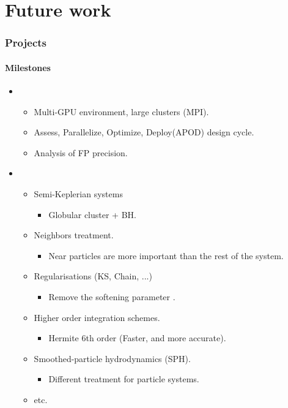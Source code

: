 \section{Future work}
\begin{frame}
    \frametitle{Projects}
    \framesubtitle{Milestones}

    \begin{itemize}
        \item {}
        \begin{itemize}
            \item<2-> Multi-GPU environment, large clusters (MPI).
            \item<3-> Assess, Parallelize, Optimize, Deploy(APOD) design cycle.
            \item<4-> Analysis of FP precision.
        \end{itemize}
        \item {}
        \begin{itemize}
            \item<5-> Semi-Keplerian systems
            \begin{itemize}
                \item Globular cluster + BH.
            \end{itemize}
            \item<6-> Neighbors treatment.
            \begin{itemize}
                \item Near particles are more important than the rest of the system.
            \end{itemize}
            \item<7-> Regularisations (KS, Chain, ...)
            \begin{itemize}
                \item Remove the softening parameter .
            \end{itemize}
            \item<8-> Higher order integration schemes.
            \begin{itemize}
                \item Hermite 6th order (Faster, and more accurate).
            \end{itemize}
            \item<9-> Smoothed-particle hydrodynamics (SPH).
            \begin{itemize}
                \item Different treatment for particle systems.
            \end{itemize}
            \item<10-> etc.
        \end{itemize}
    \end{itemize}
\end{frame}
